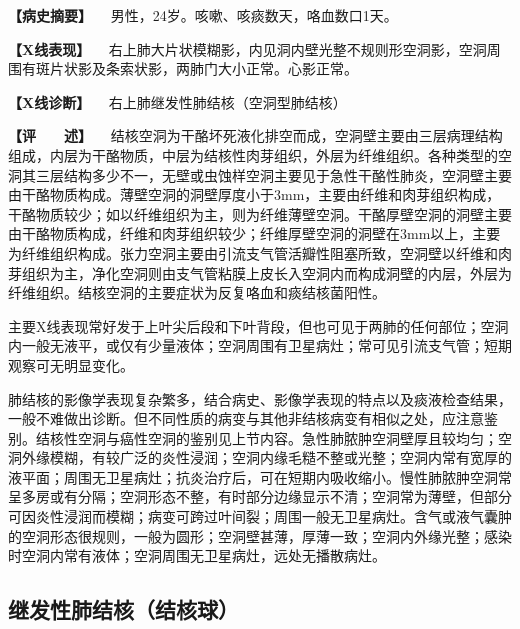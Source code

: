 \textbf{【病史摘要】} 　男性，24岁。咳嗽、咳痰数天，咯血数口1天。

\textbf{【X线表现】}
　右上肺大片状模糊影，内见洞内壁光整不规则形空洞影，空洞周围有斑片状影及条索状影，两肺门大小正常。心影正常。

\textbf{【X线诊断】} 　右上肺继发性肺结核（空洞型肺结核）

\textbf{【评　　述】}
　结核空洞为干酪坏死液化排空而成，空洞壁主要由三层病理结构组成，内层为干酪物质，中层为结核性肉芽组织，外层为纤维组织。各种类型的空洞其三层结构多少不一，无壁或虫蚀样空洞主要见于急性干酪性肺炎，空洞壁主要由干酪物质构成。薄壁空洞的洞壁厚度小于3mm，主要由纤维和肉芽组织构成，干酪物质较少；如以纤维组织为主，则为纤维薄壁空洞。干酪厚壁空洞的洞壁主要由干酪物质构成，纤维和肉芽组织较少；纤维厚壁空洞的洞壁在3mm以上，主要为纤维组织构成。张力空洞主要由引流支气管活瓣性阻塞所致，空洞壁以纤维和肉芽组织为主，净化空洞则由支气管粘膜上皮长入空洞内而构成洞壁的内层，外层为纤维组织。结核空洞的主要症状为反复咯血和痰结核菌阳性。

主要X线表现常好发于上叶尖后段和下叶背段，但也可见于两肺的任何部位；空洞内一般无液平，或仅有少量液体；空洞周围有卫星病灶；常可见引流支气管；短期观察可无明显变化。

肺结核的影像学表现复杂繁多，结合病史、影像学表现的特点以及痰液检查结果，一般不难做出诊断。但不同性质的病变与其他非结核病变有相似之处，应注意鉴别。结核性空洞与癌性空洞的鉴别见上节内容。急性肺脓肿空洞壁厚且较均匀；空洞外缘模糊，有较广泛的炎性浸润；空洞内缘毛糙不整或光整；空洞内常有宽厚的液平面；周围无卫星病灶；抗炎治疗后，可在短期内吸收缩小。慢性肺脓肿空洞常呈多房或有分隔；空洞形态不整，有时部分边缘显示不清；空洞常为薄壁，但部分可因炎性浸润而模糊；病变可跨过叶间裂；周围一般无卫星病灶。含气或液气囊肿的空洞形态很规则，一般为圆形；空洞壁甚薄，厚薄一致；空洞内外缘光整；感染时空洞内常有液体；空洞周围无卫星病灶，远处无播散病灶。

\subsection{继发性肺结核（结核球）}

